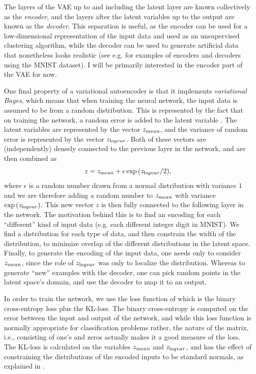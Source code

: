 \documentclass[letterpaper,10pt]{article}
\begin{document}
The layers of the VAE up to and including the latent layer are known collectively as the {\it encoder}, and the layers after the latent variables 
up to the output are known as the {\it decoder}.  This separation is useful, as the encoder can be used for a low-dimensional representation of 
the input data and used as an unsupervised clustering algorithm, while the decoder can be used to generate artificial data that nonetheless looks 
realistic (see e.g. \cite{vaemnist} for examples of encoders and decoders using the MNIST \cite{mnist} dataset).  I will be primarily interested in 
the encoder part of the VAE for now.

One final property of a variational autoencoder is that it implements {\it variational Bayes}, which means that when training the neural network, 
the input data is assumed to be from a random distribution.  This is represented by the fact that on training the network, a random error is added to 
the latent variable \cite{vae, kerasauto}.  The latent variables are represented by the vector $z_{\text mean}$, and the variance of 
random error is represented by the vector $z_{\text log var}$.  Both of these vectors are (independently) densely connected to 
the previous layer in the network, and are then combined as
\begin{equation}
 z = z_{\text mean} + \epsilon \exp{\left(z_{\text log var}/2\right)},
\end{equation}
where $\epsilon$ is a random number drawn from a normal distribution with variance $1$ and we are therefore adding a random number to 
$z_{\text mean}$ with variance $\exp{\left(z_{\text log var}\right)}$.  This new vector $z$ is then fully connected to the following layer in the network.  
The motivation behind this is to find an encoding for each ``different'' kind of input data (e.g. each different integer digit in MNIST).  We find 
a distribution for each type of data, and then constrain the width of the distribution, to minimize overlap of the different distributions in the latent 
space.  Finally, to generate the encoding of the input data, one needs only to consider $z_{\text mean}$, since the role of $z_{\text log var}$ was 
only to localize the distribution.  Whereas to generate ``new'' examples with the decoder, one can pick random points in the latent space's domain, and use 
the decoder to map it to an output.

In order to train the network, we use the loss function of \cite{kerasauto} which is the binary cross-entropy loss plus the KL-loss. The binary 
cross-entropy is computed on the error between the input and output of the network, and while this loss function is normally appropriate for 
classification problems rather, the nature of the matrix, i.e., consisting of one's and zeros actually makes it a good measure of the loss.  The 
KL-loss is calculated on the variables $z_{\text mean}$ and $z_{\text log var}$, and has the effect of constraining the distributions of the encoded 
inputs to be standard normals, as explained in \cite{klexplain}.
\end{document}
